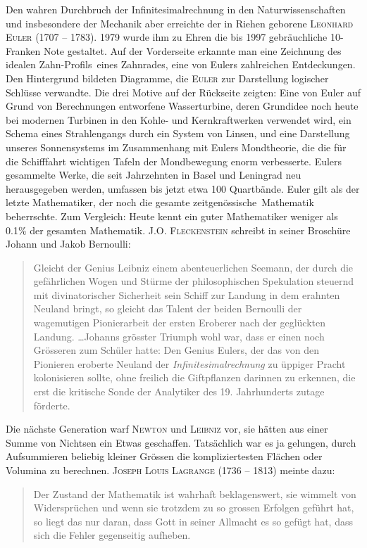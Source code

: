 \documentclass[%
11pt,%
twoside,%
titlepage,%
german,%
headsepline%
]{scrartcl}
\begin{document}
Den wahren Durchbruch der Infinitesimalrechnung in den Naturwissenschaften und insbesondere der Mechanik aber erreichte der in Riehen geborene \textsc{Leonhard Euler} (1707 -- 1783). 1979 wurde ihm zu Ehren die bis 1997 gebr\"auchliche 10-Franken Note gestaltet.
Auf der Vorderseite erkannte man eine Zeichnung des idealen \glqq Zahn-Profils\grqq\ eines Zahnrades, eine von Eulers zahlreichen Entdeckungen. Den Hintergrund bildeten Diagramme, die \textsc{Euler} zur Darstellung logischer Schl\"usse verwandte. Die drei Motive auf der R\"uckseite zeigten: Eine von Euler auf Grund von Berechnungen entworfene Wasserturbine, deren Grundidee noch heute bei modernen Turbinen in den Kohle- und Kernkraftwerken verwendet wird, ein Schema eines Strahlengangs durch ein System von Linsen, und eine Darstellung unseres Sonnensystems im Zusammenhang mit Eulers Mondtheorie, die die f\"ur die Schifffahrt wichtigen Tafeln der Mondbewegung enorm verbesserte.
Eulers gesammelte Werke, die seit Jahrzehnten in Basel und Leningrad neu herausgegeben werden, umfassen bis jetzt etwa 100 Quartb\"ande. Euler gilt als der letzte Mathematiker, der noch die gesamte \glqq zeitgen\"ossische\grqq\ Mathematik beherrschte. Zum Vergleich: Heute kennt ein guter Mathematiker weniger als  0.1\% der gesamten Mathematik.
\textsc{J.O. Fleckenstein} schreibt in seiner Brosch\"ure \glqq Johann und Jakob Bernoulli\grqq:
\begin{quote}
\glqq Gleicht der Genius Leibniz einem abenteuerlichen Seemann, der durch die gef\"ahrlichen Wogen und St\"urme der philosophischen Spekulation steuernd mit divinatorischer Sicherheit sein Schiff zur Landung in dem erahnten Neuland bringt, so gleicht das Talent der beiden Bernoulli der wagemutigen Pionierarbeit der ersten Eroberer nach der gegl\"uckten Landung. \dots Johanns gr\"osster Triumph wohl war, dass er einen noch Gr\"osseren zum Sch\"uler hatte: Den Genius Eulers, der das von den Pionieren eroberte Neuland der \emph{Infinitesimalrechnung} zu \"uppiger Pracht kolonisieren sollte, ohne freilich die Giftpflanzen darinnen zu erkennen, die erst die kritische Sonde der Analytiker des 19. Jahrhunderts zutage f\"orderte.\grqq
\end{quote}
Die n\"achste Generation warf \textsc{Newton} und \textsc{Leibniz} vor, sie h\"atten aus einer Summe von Nichtsen ein Etwas geschaffen. Tats\"achlich war es ja gelungen, durch Aufsummieren beliebig kleiner Gr\"ossen die kompliziertesten Fl\"achen oder Volumina zu berechnen.
\textsc{Joseph Louis Lagrange} (1736 -- 1813) meinte dazu:
\begin{quote}
\glqq Der Zustand der Mathematik ist wahrhaft beklagenswert, sie wimmelt von Widerspr\"uchen und wenn sie trotzdem zu so grossen Erfolgen gef\"uhrt hat, so liegt das nur daran, dass Gott in seiner Allmacht es so gef\"ugt hat, dass sich die Fehler gegenseitig aufheben.\grqq
\end{quote}
\end{document}
